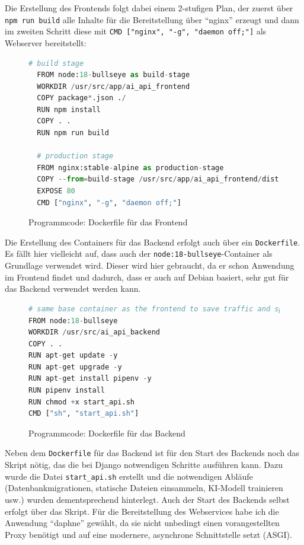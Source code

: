 \documentclass[12pt,oneside,titlepage,listof=totoc,bibliography=totoc]{scrartcl}
\newcommand{\code}[1]{\colorbox{code-gray}{\texttt{#1}}}
\begin{document}
Die Erstellung des Frontends folgt dabei einem 2-stufigen Plan, der zuerst über \code{npm run build} alle Inhalte für die Bereitstellung über \enquote{nginx} erzeugt und dann im zweiten Schritt diese mit \code{CMD ["nginx", "-g", "daemon off;"]} als Webserver bereitstellt:

\begin{figure}[H]
	\caption{Programmcode: Dockerfile für das Frontend}
	\label{fig:code-dockerfile-frontend}
\begin{lstlisting}[language=python]
  # build stage
  FROM node:18-bullseye as build-stage
  WORKDIR /usr/src/app/ai_api_frontend
  COPY package*.json ./
  RUN npm install
  COPY . .
  RUN npm run build
  
  # production stage
  FROM nginx:stable-alpine as production-stage
  COPY --from=build-stage /usr/src/app/ai_api_frontend/dist /usr/share/nginx/html
  EXPOSE 80
  CMD ["nginx", "-g", "daemon off;"]
\end{lstlisting}
\end{figure}


Die Erstellung des Containers für das Backend erfolgt auch über ein \code{Dockerfile}. Es fällt hier vielleicht auf, dass auch der \code{node:18-bullseye}-Container als Grundlage verwendet wird. Dieser wird hier gebraucht, da er schon Anwendung im Frontend findet und dadurch, dass er auch auf Debian basiert, sehr gut für das Backend verwendet werden kann. 


\begin{figure}[H]
	\caption{Programmcode: Dockerfile für das Backend}
	\label{fig:code-dockerfile-backend}
\begin{lstlisting}[language=python]
# same base container as the frontend to save traffic and space 
FROM node:18-bullseye
WORKDIR /usr/src/ai_api_backend
COPY . .
RUN apt-get update -y
RUN apt-get upgrade -y
RUN apt-get install pipenv -y
RUN pipenv install
RUN chmod +x start_api.sh
CMD ["sh", "start_api.sh"]
\end{lstlisting}
\end{figure}

Neben dem \code{Dockerfile} für das Backend ist für den Start des Backends noch das Skript nötig, das die bei Django notwendigen Schritte ausführen kann. Dazu wurde die Datei \code{start_api.sh} erstellt und die notwendigen Abläufe (Datenbankmigrationen, statische Dateien einsammeln, KI-Modell trainieren usw.) wurden dementsprechend hinterlegt. Auch der Start des Backends selbst erfolgt über das Skript. Für die Bereitstellung des Webservices habe ich die Anwendung \enquote{daphne} gewählt, da sie nicht unbedingt einen vorangestellten Proxy benötigt und auf eine modernere, asynchrone Schnittstelle setzt (ASGI). 
\end{document}
